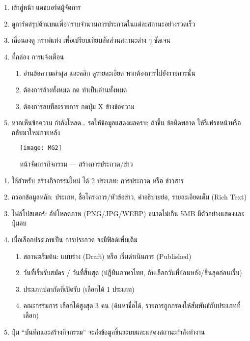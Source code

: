 \begin{sloppypar}
	\begin{enumerate}
		\item เข้าสู่หน้า แดชบอร์ดผู้จัดการ
		\item ดูการ์ดสรุปด้านบนเพื่อทราบจำนวนการประกวดในแต่ละสถานะอย่างรวดเร็ว
		\item เลื่อนลงดู กราฟแท่ง เพื่อเปรียบเทียบสัดส่วนสถานะต่าง ๆ ชัดเจน
		\item ที่กล่อง การแจ้งเตือน
		\begin{enumerate}
			\item อ่านข้อความล่าสุด และคลิก ดูรายละเอียด หากต้องการไปยังรายการนั้น
			\item ต้องการล้างทั้งหมด กด ทำเป็นอ่านทั้งหมด
			\item ต้องการลบทีละรายการ กดปุ่ม X ข้างข้อความ
		\end{enumerate}
		\item หากเห็นข้อความ กำลังโหลด… รอให้ข้อมูลแสดงผลครบ; ถ้าขึ้น ข้อผิดพลาด ให้รีเฟรชหน้าหรือกลับมาใหม่ภายหลัง
	\end{enumerate}
\end{sloppypar}

\vspace{\baselineskip}

\begin{figure}[h]
	\centering
	\texttt{[image: MG2]}
	\caption{หน้าจัดการกิจกรรม — สร้างการประกวด/ข่าว}
\end{figure}

\par

\begin{sloppypar}
	\begin{enumerate}
		\item ใช้สำหรับ สร้างกิจกรรมใหม่ ได้ 2 ประเภท: การประกวด หรือ ข่าวสาร
		\item กรอกข้อมูลหลัก: ประเภท, ชื่อโครงการ/หัวข้อข่าว, คำอธิบายย่อ, รายละเอียดเต็ม (Rich Text)
		\item ไฟล์โปสเตอร์: อัปโหลดภาพ (PNG/JPG/WEBP) ขนาดไม่เกิน 5MB มีตัวอย่างแสดงและปุ่มลบ
		\item เมื่อเลือกประเภทเป็น การประกวด จะมีฟิลด์เพิ่มเติม
		\begin{enumerate}
			\item สถานะเริ่มต้น: แบบร่าง (Draft) หรือ เริ่มดำเนินการ (Published)
			\item วันที่เริ่มรับสมัคร / วันที่สิ้นสุด (ปฏิทินภาษาไทย, กันเลือกวันที่ย้อนหลัง/สิ้นสุดก่อนเริ่ม)
			\item ประเภทปลากัดที่เปิดรับ (เลือกได้ 1 ประเภท)
			\item คณะกรรมการ เลือกได้สูงสุด 3 คน (ค้นหาชื่อได้, รายการถูกกรองให้สัมพันธ์กับประเภทที่เลือก)
		\end{enumerate}
		\item ปุ่ม “บันทึกและสร้างกิจกรรม” จะส่งข้อมูลขึ้นระบบและแสดงสถานะกำลังทำงาน
	\end{enumerate}
\end{sloppypar}

